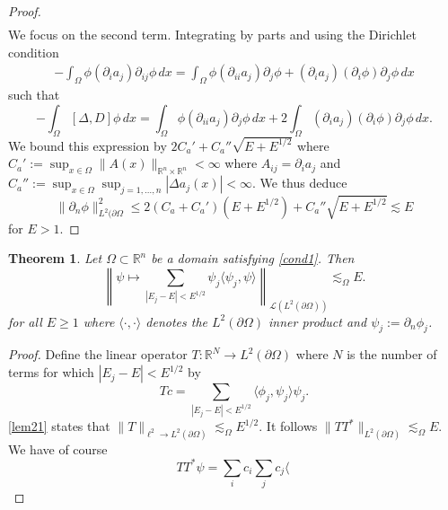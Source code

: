 \documentclass{article}
\newcommand{\R}{\mathbb{R}}
\newtheorem{thm}{Theorem}\newcommand{\thmautorefname}{Theorem}
\begin{document}
\begin{proof}
\begin{align*}
\end{align*}
We focus on the second term. Integrating by parts and using the Dirichlet condition
\begin{align*}
- \int_{\Omega} \phi (\partial_i a_j) \partial_{ij} \phi \, dx = \int_{\Omega} \phi (\partial_{ii} a_j)\partial_j \phi + (\partial_i a_j)(\partial_i \phi)\partial_j \phi \, dx
\end{align*}
such that
\begin{equation}
\label{eq-28}
- \int_{\Omega} [\Delta, D] \phi \, dx = \int_{\Omega} \phi (\partial_{ii} a_j)\partial_j \phi \, dx + 2 \int_{\Omega} (\partial_i a_j)(\partial_i \phi)\partial_j \phi \, dx.
\end{equation}
We bound this expression by $2 C_a' + C_a'' \sqrt{E + E^{1/2}}$ where $C_a' := \sup_{x \in \Omega} \lVert A(x) \rVert_{\R^n \times \R^n} < \infty$ where $A_{ij} = \partial_i a_j$ and $C_a'' := \sup_{x \in \Omega} \sup_{j=1,\dots,n} |\Delta a_j (x)| < \infty$.
We thus deduce
\[
\lVert \partial_n \phi \rVert_{L^2(\partial \Omega}^2 \le 2 (C_a + C_a') (E + E^{1/2}) + C_a'' \sqrt{E + E^{1/2}} \lesssim E
\]
for $E > 1$.
\end{proof}
\begin{thm}
Let $\Omega \subset \R^n$ be a domain satisfying \autoref{cond1}. Then
\[
\left\lVert \psi \mapsto \sum_{|E_j - E| < E^{1/2}} \psi_j \langle \psi_j, \psi \rangle \right\rVert_{\mathcal{L}(L^2(\partial \Omega))} \lesssim_\Omega E.
\]
for all $E \ge 1$ where $\langle \cdot, \cdot \rangle$ denotes the $L^2(\partial \Omega)$ inner product and $\psi_j := \partial_n \phi_j$.
\end{thm}
\begin{proof}
Define the linear operator $T : \R^N \to L^2(\partial \Omega)$ where $N$ is the number of terms for which $|E_j - E| < E^{1/2}$ by
\[
T c = \sum_{|E_j - E| < E^{1/2}} \langle \phi_j, \psi_j \rangle  \psi_j.
\]
\autoref{lem21} states that $\lVert T \rVert_{\ell^2 \to L^2(\partial \Omega)} \lesssim_\Omega E^{1/2}$.
It follows $\lVert T T^* \rVert_{L^2(\partial \Omega)} \lesssim_\Omega E$.
We have of course
\[
T T^* \psi =  \sum_{i} c_i \sum_{j} c_j \langle \
\]
\end{proof}
\end{document}
